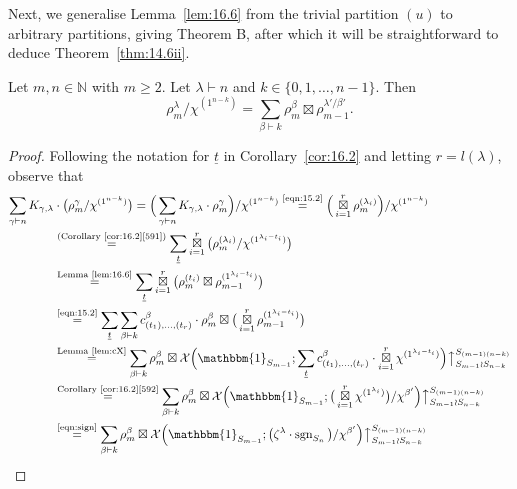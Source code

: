 \documentclass[ALCO, Unicode]{cedram}
\newcommand{\triv}{\mathbbm{1}}
\newcommand{\sgn}{\operatorname{sgn}}
\newcommand{\up}{\big\uparrow}
\newcommand{\cX}{\mathcal{X}}
\newcommand{\N}{\mathbb{N}}
\begin{document}
Next, we generalise Lemma~\ref{lem:16.6} from the trivial partition $(u)$ to arbitrary partitions, giving Theorem B, after which it will be straightforward to deduce Theorem~\ref{thm:14.6ii}.

\begin{theorem}[Theorem B]\label{thm:16.7}
	Let $m,n\in\N$ with $m\ge 2$. Let $\lambda\vdash n$ and $k\in\{0,1,\dotsc,n-1\}$. Then
	\[ \rho^\lambda_m/\chi^{(1^{n-k})} = \sum_{\beta\vdash k} \rho^\beta_m\boxtimes \rho^{\lambda'/\beta'}_{m-1}. \]
\end{theorem}

\begin{proof}
	Following the notation for $\underline{t}$ in Corollary~\ref{cor:16.2} and letting $r=l(\lambda)$, observe that
	\begin{align*}
		\sum_{\gamma\vdash n} K_{\gamma,\lambda} &\cdot \big( \rho^\gamma_m/\chi^{(1^{n-k})} \big) = \Big( \sum_{\gamma\vdash n} K_{\gamma,\lambda}\cdot \rho^\gamma_m \Big)/\chi^{(1^{n-k})} \overset{\normalfont\tiny\text{\eqref{eqn:15.2}}}{=} \Big( \operatorname*{\boxtimes}_{i=1}^r \rho^{(\lambda_i)}_m\Big)/\chi^{(1^{n-k})}\\
		&\overset{\normalfont\tiny\text{(Corollary~\ref{cor:16.2}\ref{591})}}{=} \sum_{\underline{t}} \operatorname*{\boxtimes}_{i=1}^r \big( \rho^{(\lambda_i)}_m/\chi^{(1^{\lambda_i-t_i})} \big)\\
		&\overset{\normalfont\tiny\text{Lemma~\ref{lem:16.6}}}{=} \sum_{\underline{t}} \operatorname*{\boxtimes}_{i=1}^r \big( \rho^{(t_i)}_m \boxtimes \rho^{(1^{\lambda_i-t_i})}_{m-1} \big)\\
		&\overset{\normalfont\tiny\text{\eqref{eqn:15.2}}}{=} \sum_{\underline{t}} \sum_{\beta\vdash k} c^\beta_{(t_1),\dotsc,(t_r)}\cdot\rho^\beta_m \boxtimes \big(\operatorname*{\boxtimes}_{i=1}^r \rho^{(1^{\lambda_i-t_i})}_{m-1}\big)\\
		&\overset{\normalfont\tiny \text{Lemma~\ref{lem:cX}}}{=} \sum_{\beta\vdash k} \rho^\beta_m \boxtimes \cX\Big(\triv_{S_{m-1}}; \sum_{\underline{t}} c^\beta_{(t_1),\dotsc,(t_r)}\cdot \operatorname*{\boxtimes}_{i=1}^r \chi^{(1^{\lambda_i-t_i})} \Big)\up_{S_{m-1}\wr S_{n-k}}^{S_{(m-1)(n-k)}}\\
		&\overset{\normalfont\tiny\text{Corollary~\ref{cor:16.2}\ref{592}}}{=} \sum_{\beta\vdash k} \rho^\beta_m \boxtimes \cX \Big( \triv_{S_{m-1}}; \big( \operatorname*{\boxtimes}_{i=1}^r \chi^{(1^{\lambda_i})}\big) /\chi^{\beta'} \Big) \up_{S_{m-1}\wr S_{n-k}}^{S_{(m-1)(n-k)}}\\
		&\overset{\normalfont\tiny\text{\eqref{eqn:sign}}}{=} \sum_{\beta\vdash k} \rho^\beta_m \boxtimes \cX \Big( \triv_{S_{m-1}}; \big( \zeta^\lambda\cdot\sgn_{S_n} \big) /\chi^{\beta'} \Big) \up_{S_{m-1}\wr S_{n-k}}^{S_{(m-1)(n-k)}}\\

\end{align*}
\end{proof}
\end{document}
